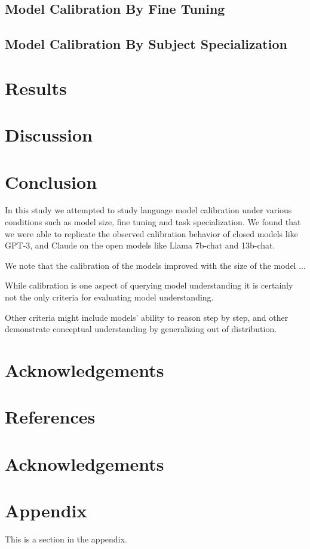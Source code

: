 \documentclass[11pt]{article}
\begin{document}
\subsection{Model Calibration By Fine Tuning}  


\subsection{Model Calibration By Subject Specialization}  

\section{Results}

\section{Discussion}

\section{Conclusion}

In this study we attempted to study language model calibration 
under various conditions such as model size, fine tuning and  
task specialization. We found that we were able to replicate the 
observed  calibration behavior of closed models like GPT-3, and 
Claude on the open models like Llama 7b-chat and 13b-chat. 

We note that the calibration of the models  improved with the size 
of the model ...

While calibration is one aspect of querying model understanding it is 
certainly  not the only criteria for evaluating model understanding.  

Other criteria might include models' ability to reason step by step, 
and other demonstrate conceptual understanding by generalizing 
out of distribution. 


\section{Acknowledgements}

\section{References}

\section{Acknowledgements}




\appendix

\section{Appendix}
\label{sec:appendix}

This is a section in the appendix.
\end{document}
